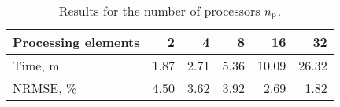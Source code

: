 \begin{table}[h]
  \centering
  \caption{Results for the number of processors ${n_\text{p}}$.}
  \begin{tabular*}{0.90\linewidth}{lrrrrr}
    \toprule
    Processing elements & 2 & 4 & 8 & 16 & 32 \\
    \midrule
    Time, m   & 1.87 & 2.71 & 5.36 & 10.09 & 26.32 \\
    NRMSE, \% & 4.50 & 3.62 & 3.92 &  2.69 &  1.82 \\
    \bottomrule
  \end{tabular*}
  \vspace{-1em}
\end{table}

